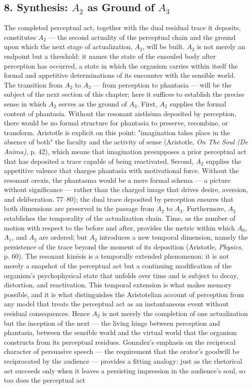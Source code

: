 \subsection*{8. Synthesis: $A_2$ as Ground of $A_3$}

The completed perceptual act, together with the dual residual trace it deposits, constitutes $A_2$ --- the second actuality of the perceptual chain and the ground upon which the next stage of actualization, $A_3$, will be built. $A_2$ is not merely an endpoint but a threshold: it names the state of the ensouled body after perception has occurred, a state in which the organism carries within itself the formal and appetitive determinations of its encounter with the sensible world. The transition from $A_2$ to $A_3$ --- from perception to phantasia --- will be the subject of the next section of this chapter; here it suffices to establish the precise sense in which $A_2$ serves as the ground of $A_3$. First, $A_2$ supplies the formal content of phantasia. Without the resonant aisthēma deposited by perception, there would be no formal structure for phantasia to preserve, recombine, or transform. Aristotle is explicit on this point: "imagination takes place in the absence of both" the faculty and the activity of sense (Aristotle, \textit{On The Soul (De Anima)}, p. 42), which means that imagination presupposes a prior perceptual act that has deposited a trace capable of being reactivated. Second, $A_2$ supplies the appetitive valence that charges phantasia with motivational force. Without the resonant orexis, the phantasma would be a mere formal schema --- a picture without significance --- rather than the charged image that drives desire, aversion, and deliberation. 77--80); the dual trace deposited by perception ensures that both dimensions are preserved in the passage from $A_2$ to $A_3$. Furthermore, $A_2$ establishes the temporality of the actualization chain. Time, as the number of motion with respect to the before and after, provides the metric within which $A_0$, $A_1$, and $A_2$ are ordered; but $A_2$ introduces a new temporal dimension, namely the persistence of the trace beyond the moment of its deposition (Aristotle, \textit{Physics}, p. 60). The resonant kinēsis is a temporally extended phenomenon: it is not merely a snapshot of the perceptual act but a continuing modification of the organism's psychophysical state that unfolds over time and is subject to decay, distortion, and reactivation. This temporal extension is what makes memory possible, and it is what distinguishes the Aristotelian account of perception from any model that treats the perceptual act as an instantaneous event without residual consequences. Hence $A_2$ is not merely the completion of one actualization but the inception of the next --- the living hinge between perception and phantasia, between the sensible world and the virtual world that the organism constructs from its perceptual residues. Gonzalez's emphasis on the reciprocal character of persuasive speech --- the requirement that the orator's goodwill be reciprocated by the audience --- provides a fitting analogy: just as the rhetorical act succeeds only when it leaves a persisting impression in the audience's soul, so too does the perceptual act 